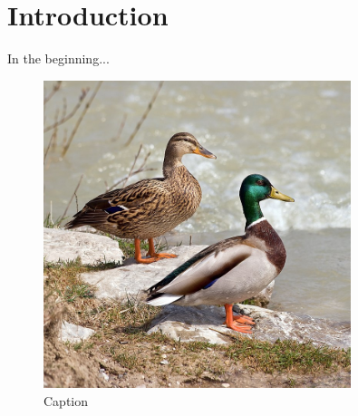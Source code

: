 \documentclass[11pt, a4paper, oneside]{book}
\newcommand\Bilderwidth{0.8}
\begin{document}

\frontmatter

\tableofcontents
\mainmatter

\chapter{Introduction}

In the beginning\cite{Test}...

\begin{figure}[h]
    \centering
    \includegraphics[width=\Bilderwidth\textwidth]{Bilder/example_duck.jpg}
    \caption{Caption}
    \label{fig:Label}
\end{figure}


\end{document}
